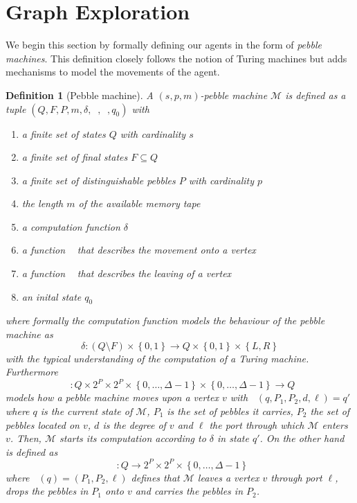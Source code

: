 \documentclass[oneside]{scrartcl}
\newtheorem{definition}{Definition}
\DeclareMathOperator{\din}{\delta_{\mathit{in}}}
\DeclareMathOperator{\dout}{\delta_{\mathit{out}}}
\begin{document}
\section{Graph Exploration}
We begin this section by formally defining our agents in the form of
\emph{pebble machines}. This definition closely follows the notion of Turing
machines but adds mechanisms to model the movements of the agent.
\begin{definition}[Pebble machine]
  A $(s,p,m)$-\emph{pebble machine} $\mathcal{M}$ is defined as a tuple
  $(Q,F,P,m,\delta,\din,\dout,q_{0})$ with
  \begin{enumerate}
    \item a finite set of states $Q$ with cardinality $s$
    \item a finite set of final states $F\subseteq Q$
    \item a finite set of distinguishable pebbles $P$ with cardinality $p$
    \item the length $m$ of the available memory tape
    \item a computation function $\delta$
    \item a function $\din$ that describes the movement onto a vertex
    \item a function $\dout$ that describes the leaving of a vertex
    \item an inital state $q_{0}$
  \end{enumerate}
  where formally the computation function models the behaviour of the pebble
  machine as
  \begin{equation*}
    \delta\colon (Q\setminus F)\times\left\{0,1\right\}\rightarrow
    Q\times\left\{0,1\right\}\times\left\{L,R\right\}
  \end{equation*}
  with the typical understanding of the computation of a Turing machine.
  Furthermore
  \begin{equation*}
    \din\colon Q\times 2^{P}\times 2^{P}\times
    \left\{0,\dots,\Delta - 1\right\}\times\left\{0,\dots,\Delta - 1\right\}
    \rightarrow Q
  \end{equation*}
  models how a pebble machine moves upon a vertex $v$ with
  $\din(q,P_{1},P_{2},d,\ell) = q'$ where $q$ is the current state of
  $\mathcal{M}$, $P_{1}$ is the set of pebbles it carries, $P_{2}$ the set
  of pebbles located on $v$, $d$ is the degree of $v$ and $\ell$ the port
  through which $\mathcal{M}$ enters $v$. Then, $\mathcal{M}$ starts its
  computation according to $\delta$ in state $q'$.  On the other hand $\dout$
  is defined as
  \begin{equation*}
    \dout\colon Q
    \rightarrow 2^{P}\times 2^{P}\times \left\{0,\dots,\Delta - 1\right\}
  \end{equation*}
  where $\dout(q) = (P_{1}, P_{2}, \ell)$ defines that $\mathcal{M}$ leaves
  a vertex $v$ through port $\ell$, drops the pebbles in $P_{1}$ onto $v$
  and carries the pebbles in $P_{2}$.


\end{definition}
\end{document}
